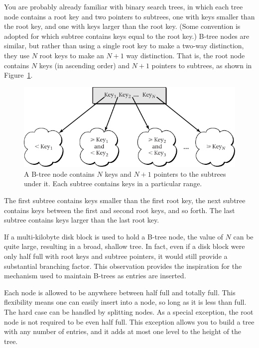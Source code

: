 You are probably already familiar with binary search trees, in which
each tree node contains a root key and two pointers to subtrees, one
with keys smaller than the root key, and one with keys larger than the
root key.  (Some convention is adopted for which subtree contains keys
equal to the root key.)  B-tree nodes are similar, but rather than
using a single root key to make a two-way distinction, they use $N$
root keys to make an $N+1$ way distinction.  That is, the root node
contains $N$ keys (in ascending order) and $N+1$ pointers to subtrees,
as shown in Figure~\ref{scan-8-1}.
\begin{figure}
\centerline{\includegraphics{hail_f0811}}
\caption{A B-tree node contains $N$ keys and $N+1$ pointers to the
subtrees under it.  Each subtree contains keys in a particular range.}
\label{scan-8-1}
\end{figure}
The first subtree contains keys smaller than the first root key, the
next subtree contains keys between the first and second root keys,
and so forth.  The last subtree contains keys larger than the last root key.

If a multi-kilobyte disk block is used to hold a B-tree node, the
value of $N$ can be quite large, resulting in a broad, shallow tree.
In fact, even if a disk block were only half full with root keys and
subtree pointers, it would still provide a substantial branching
factor.  This observation provides the inspiration for the mechanism
used to maintain B-trees as entries are inserted.

Each node is allowed to be anywhere between half full and totally
full.
This flexibility means one can easily insert into a node, so long as
it is less than full.
The hard case can be handled by
splitting nodes.  As a special exception, the root node is not
required to be even half full.  This exception allows you to build a
tree with any number of entries, and it adds at most one level to the height
of the tree.


